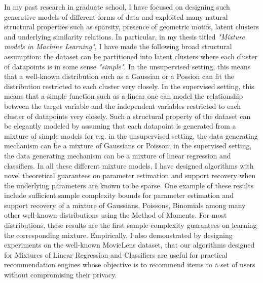 \documentclass[paper=a4, fontsize=12pt]{article}
\begin{document}
In my past research in graduate school, I have focused on designing such generative models of different forms of data and exploited many natural structural properties such as sparsity, presence of geometric motifs, latent clusters and underlying similarity relations. In particular, in my thesis titled \textit{"Mixture models in Machine Learning"}, I have made the following broad structural assumption: the dataset can be partitioned into latent clusters where each cluster of datapoints is in some sense \textit{"simple"}. In the unsupervised setting, this means that a well-known distribution such as a Gaussian or a Possion can fit the distribution restricted to each cluster very closely. In the supervised setting, this means that a simple function such as a linear one can model the relationship between the target variable and the independent variables restricted to each cluster of datapoints very closely. Such a structural property of the dataset can be elegantly modeled by assuming that each datapoint is generated from a mixture of simple models for e.g. in the unsupervised setting, the data generating mechanism can be a mixture of Gaussians or Poisson; in the supervised setting, the data generating mechanism can be a mixture of linear regression and classifiers. In all these different mixture models, I have designed algorithms with novel theoretical guarantees on parameter estimation and support recovery when the underlying parameters are known to be sparse. One example of these results include  sufficient sample complexity bounds for parameter estimation \cite{davies2021lower,KrishnamurthyM020} and support recovery \cite{mazumdar2022learning} of a mixture of Gaussians, Poissons, Binomials among many other well-known distributions using the Method of Moments. For most distributions, these results are the first sample complexity guarantees on learning the corresponding mixture. Empirically, I also demonstrated by designing experiments on the well-known MovieLens dataset, that our algorithms designed for Mixtures of Linear Regression and Classifiers \cite{gandikota2020learning, gandikota2021support} are useful for practical recommendation engines whose objective is to recommend items to a set of users without compromising their privacy.
\end{document}
